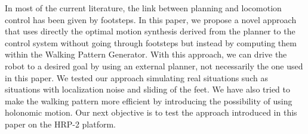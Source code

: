 In most of the current literature, the link between planning and locomotion control has been given by footsteps. In this paper, we propose a novel approach that uses directly the optimal motion synthesis derived from the planner to the control system without going through footsteps but instead by computing them within the Walking Pattern Generator. With this approach, we can drive the robot to a desired goal by using an external planner, not necessarily the one used in this paper. We tested our approach simulating real situations such as situations with localization noise and sliding of the feet. We have also tried to make the walking pattern more efficient by introducing the possibility of using holonomic motion. Our next objective is to test the approach introduced in this paper on the HRP-2 platform.

